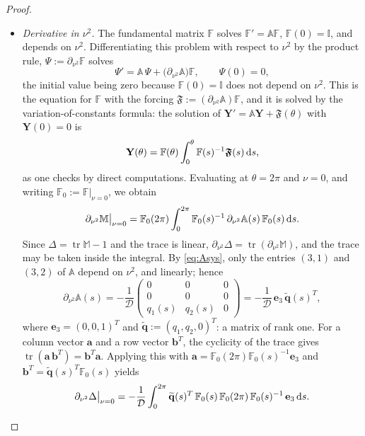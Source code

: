 \documentclass[reqno]{amsart}
\newcommand{\F}{\mathbb{F}}
\newcommand{\D}{\mathcal{D}}
\newcommand{\tr}{\operatorname{tr}}     %
\begin{document}
\begin{proof}
\begin{enumerate}
\begin{itemize}
\item \emph{Derivative in $\nu^2$.} The fundamental matrix $\F$ solves $\F'=\mathbb A\F$, $\F(0)=\mathbb I$, and depends on $\nu^2$. Differentiating this problem with respect to $\nu^2$ by the product rule, $\Psi:=\partial_{\nu^2}\F$ solves
\[
\Psi'=\mathbb A\,\Psi+\big(\partial_{\nu^2}\mathbb A\big)\F,\qquad \Psi(0)=0,
\]
the initial value being zero because $\F(0)=\mathbb I$ does not depend on $\nu^2$. This is the equation for $\F$ with the  forcing $\boldsymbol{\mathfrak{ F}}:=(\partial_{\nu^2}\mathbb A)\F$, and it is solved by the variation-of-constants formula: the solution of $\mathbf Y'=\mathbb A\mathbf Y+\boldsymbol{\mathfrak{ F}}(\theta)$ with $\mathbf Y(0)=0$ is
\[
\mathbf Y(\theta)=\F(\theta)\int_0^{\theta}\F(s)^{-1}\boldsymbol{\mathfrak{ F}}(s)\,{\rm d}s,
\]
as one checks by direct computations. Evaluating at $\theta=2\pi$ and $\nu=0$, and writing $\F_0:=\F|_{\nu=0}$, we obtain
\[
\partial_{\nu^2}\mathbb M\big|_{\nu=0}=\F_0(2\pi)\int_0^{2\pi}\F_0(s)^{-1}\,\partial_{\nu^2}\mathbb A(s)\,\F_0(s)\,{\rm d}s .
\]
Since $\Delta=\tr\mathbb M-1$ and the trace is linear, $\partial_{\nu^2}\Delta=\tr(\partial_{\nu^2}\mathbb M)$, and the trace may be taken inside the integral. By \eqref{eq:Asys}, only the entries $(3,1)$ and $(3,2)$ of $\mathbb A$ depend on $\nu^2$, and linearly; hence
\[
\partial_{\nu^2}\mathbb A(s)=-\frac{1}{\D}\begin{pmatrix}0&0&0\\0&0&0\\ q_1(s)&q_2(s)&0\end{pmatrix}
=-\frac{1}{\D}\,\mathbf e_3\,\widetilde{\mathbf q}(s)^T,
\]
where $\mathbf e_3=(0,0,1)^T$ and $\widetilde{\mathbf q}:=(q_1,q_2,0)^T$: a matrix of rank one. For a column vector $\mathbf a$ and a row vector $\mathbf b^T$, the cyclicity of the trace gives $\tr(\mathbf a\,\mathbf b^T)=\mathbf b^T\mathbf a$. Applying this with $\mathbf a=\F_0(2\pi)\F_0(s)^{-1}\mathbf e_3$ and $\mathbf b^T=\widetilde{\mathbf q}(s)^T\F_0(s)$ yields
\begin{equation}\label{eq:dDdnu0}
\partial_{\nu^2}\Delta\big|_{\nu=0}=-\frac{1}{\D}\int_0^{2\pi}\widetilde{\mathbf q}(s)^T\,\F_0(s)\,\F_0(2\pi)\,\F_0(s)^{-1}\,\mathbf e_3\,{\rm d}s .
\end{equation}


\end{itemize}
\end{enumerate}
\end{proof}
\end{document}
